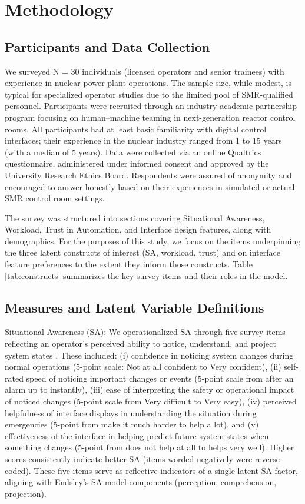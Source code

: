 \documentclass[conference]{IEEEtran}
\begin{document}
\section{Methodology}



\subsection{Participants and Data Collection}
We surveyed N = 30 individuals (licensed operators and senior trainees) with experience in nuclear power plant operations. The sample size, while modest, is typical for specialized operator studies due to the limited pool of SMR-qualified personnel. Participants were recruited through an industry-academic partnership program focusing on human–machine teaming in next-generation reactor control rooms. All participants had at least basic familiarity with digital control interfaces; their experience in the nuclear industry ranged from 1 to 15 years (with a median of 5 years). Data were collected via an online Qualtrics questionnaire, administered under informed consent and approved by the University Research Ethics Board. Respondents were assured of anonymity and encouraged to answer honestly based on their experiences in simulated or actual SMR control room settings.

The survey was structured into sections covering Situational Awareness, Workload, Trust in Automation, and Interface design features, along with demographics. For the purposes of this study, we focus on the items underpinning the three latent constructs of interest (SA, workload, trust) and on interface feature preferences to the extent they inform those constructs. Table \ref{tab:constructs} summarizes the key survey items and their roles in the model.

\subsection{Measures and Latent Variable Definitions}
Situational Awareness (SA): We operationalized SA through five survey items reflecting an operator’s perceived ability to notice, understand, and project system states \cite{endsley1995toward}. These included: (i) confidence in noticing system changes during normal operations (5-point scale: Not at all confident to Very confident), (ii) self-rated speed of noticing important changes or events (5-point scale from after an alarm up to instantly), (iii) ease of interpreting the safety or operational impact of noticed changes (5-point scale from Very difficult to Very easy), (iv) perceived helpfulness of interface displays in understanding the situation during emergencies (5-point from make it much harder to help a lot), and (v) effectiveness of the interface in helping predict future system states when something changes (5-point from does not help at all to helps very well). Higher scores consistently indicate better SA (items worded negatively were reverse-coded). These five items serve as reflective indicators of a single latent SA factor, aligning with Endsley’s SA model components (perception, comprehension, projection).
\end{document}
